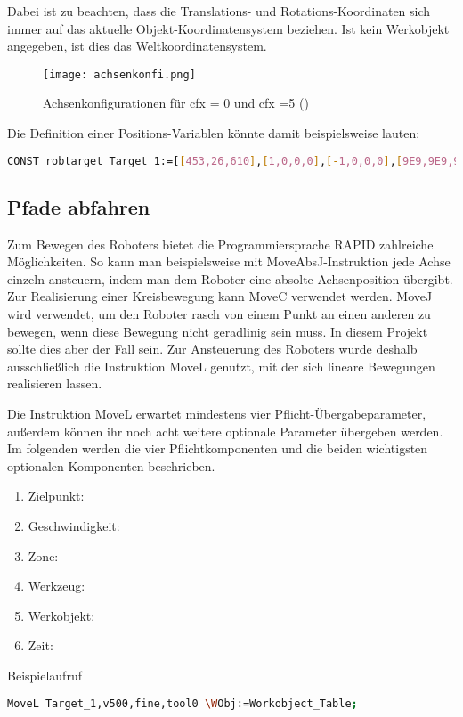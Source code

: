 Dabei ist zu beachten, dass die Translations- und Rotations-Koordinaten sich immer auf das aktuelle Objekt-Koordinatensystem beziehen. Ist kein Werkobjekt angegeben, ist dies das Weltkoordinatensystem. 

\begin{figure}[htbp]
\centering
\texttt{[image: achsenkonfi.png]}
\caption{Achsenkonfigurationen für cfx = 0 und cfx =5 (\cite{rapid2 S. 1160ff})} 
\label{achsenkonfi}
\end{figure}

Die Definition einer Positions-Variablen könnte damit beispielsweise lauten:

\begin{lstlisting}[caption=Beispiel für die Definition einer Position, label=robtarget, language=bash]
CONST robtarget Target_1:=[[453,26,610],[1,0,0,0],[-1,0,0,0],[9E9,9E9,9E9,9E9,9E9,9E9]];
\end{lstlisting} 

\subsection{Pfade abfahren}

Zum Bewegen des Roboters bietet die Programmiersprache RAPID zahlreiche Möglichkeiten. So kann man beispielsweise mit MoveAbsJ-Instruktion jede Achse einzeln ansteuern, indem man dem Roboter eine absolte Achsenposition übergibt. Zur Realisierung einer Kreisbewegung kann MoveC verwendet werden. MoveJ wird verwendet, um den Roboter rasch von einem Punkt an einen anderen zu bewegen, wenn diese Bewegung nicht geradlinig sein muss. In diesem Projekt sollte dies aber der Fall sein. Zur Ansteuerung des Roboters wurde deshalb ausschließlich die Instruktion MoveL genutzt, mit der sich lineare Bewegungen realisieren lassen. 

Die Instruktion MoveL erwartet mindestens vier Pflicht-Übergabeparameter, außerdem können ihr noch acht weitere optionale Parameter übergeben werden. Im folgenden werden die vier Pflichtkomponenten und die beiden wichtigsten optionalen Komponenten beschrieben.

\begin{enumerate}
\item Zielpunkt:

\item Geschwindigkeit:

\item Zone:

\item Werkzeug:

\item Werkobjekt:

\item Zeit:

\end{enumerate}

Beispielaufruf

\begin{lstlisting}[caption=Beispielaufruf der MoveL-Instruktion, label=movel, language=bash]
MoveL Target_1,v500,fine,tool0 \WObj:=Workobject_Table;
\end{lstlisting}